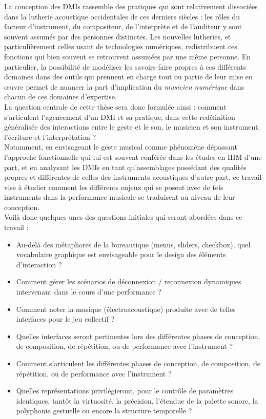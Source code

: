\noindent La conception des \glspl{DMI} rassemble des pratiques qui sont relativement dissociées dans la lutherie acoustique occidentales de ces derniers siècles : les rôles du facteur d'instrument, du compositeur, de l'interprète et de l'auditeur y sont souvent assumés par des personnes distinctes. Les nouvelles lutheries, et particulièrement celles usant de technologies numériques, redistribuent ces fonctions qui bien souvent se retrouvent assumées par une même personne. En particulier, la possibilité de modéliser les savoirs-faire propres à ces différents domaines dans des outils qui prennent en charge tout ou partie de leur mise en œuvre permet de nuancer la part d'implication du \textit{musicien numérique} dans chacun de ces domaines d'expertise.\\
\indent La question centrale de cette thèse sera donc formulée ainsi : comment s'articulent l'agencement d'un \gls{DMI} et sa pratique, dans cette redéfinition généralisée des interactions entre le geste et le son, le musicien et son instrument, l'écriture et l'interprétation ?\\
\indent Notamment, en envisageant le geste musical comme phénomène dépassant l'approche fonctionnelle qui lui est souvent conférée dans les études en \gls{IHM} d'une part, et en analysant les \glspl{DMI} en tant qu'assemblages possédant des qualités propres et différentes de celles des instruments acoustiques d'autre part, ce travail vise à étudier comment les différents enjeux qui se posent avec de tels instruments dans la performance musicale se traduisent au niveau de leur conception.\\
\indent Voilà donc quelques unes des questions initiales qui seront abordées dans ce travail : 
\vspace{-1em}
\begin{itemize}[noitemsep]
\item Au-delà des métaphores de la bureautique (menus, sliders, checkbox), quel vocabulaire graphique est envisageable pour le design des éléments d'interaction ?
\item Comment gérer les scénarios de déconnexion / reconnexion dynamiques intervenant dans le cours d'une performance ?
\item Comment noter la musique (électroacoustique) produite avec de telles interfaces pour le jeu collectif ?
\item Quelles interfaces seront pertinentes lors des différentes phases de conception, de composition, de répétition, ou de performance avec l'instrument ?
\item Comment s'articulent les différentes phases de conception, de composition, de répétition, ou de performance avec l'instrument ?
\item  Quelles représentations privilégieront, pour le contrôle de paramètres identiques, tantôt la virtuosité, la précision, l'étendue de la palette sonore, la polyphonie gestuelle ou encore la structure temporelle ?
\end{itemize}

